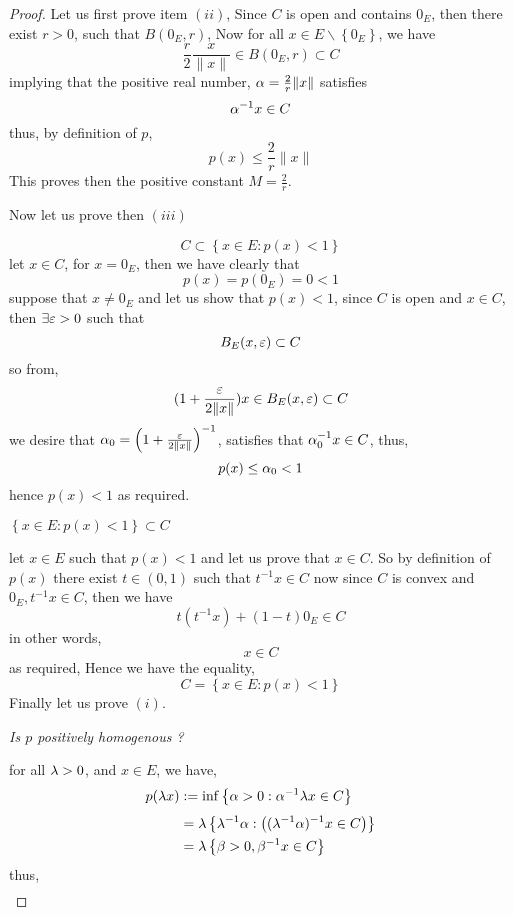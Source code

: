 \begin{proof}
Let us first prove item $(ii)$, Since $C $ is open 
and contains $0_{E}$, then there exist 
$r > 0 $, such that $B(0_{E},r)$, Now for all 
$x \in  E \backslash \left\{ 0_{E} \right\} $, we
have
\[
\frac{r}{2} \frac{x}{\| x \| } \in  B(0_{E},r) 
\subset C
\]
implying that the positive real number, 
$\alpha = \frac{2}{r}\| x \|  $  satisfies 
\[
\alpha^{-1}x \in  C
\] 
thus, by definition of $p $, 
\[
p(x) \leq \frac{2}{r} \| x \| 
\]
This proves then the positive constant $M = \frac{2}{r}$.
\\
\begin{center}
Now let us prove then $(iii)$
\end{center}
\[
C \subset \left\{  x \in  E: p(x) < 1\right\} 
\] 
let $x \in  C $, for $x = 0_{E} $, then we have clearly
that 
\[
p(x) =  p(0_{E})  = 0 <  1
\]
suppose that $x \neq 0_{E} $  and let us show
that $p(x) < 1$, since $C $ is open and $x \in  C $,
then $\exists  \varepsilon > 0 $  such that 
\[
	B_{E}(x, \varepsilon )  \subset C
\]
so from, 
\[
	(1 + \frac{\varepsilon }{2 \| x \| })
	x \in    
	B_{E}(x, \varepsilon )  \subset  C
\]
we desire that 
$\alpha_0 = \left( 1 + \frac{\varepsilon }{2 \| x \| } \right)^{-1}$, satisfies
that $\alpha_0^{-1} x \in  C $, thus, 
\[
p(x) \leq \alpha_0 < 1
\]
hence $p(x)<1$ as required.
\begin{center}
	$\left\{ x \in  E: p(x) < 1 \right\} \subset C$ 
\end{center}
let $x \in  E $ such that $p(x) <  1$ and let us prove that 
$x \in C$. So by definition of $p(x)$ there exist 
$t \in (0,1)$ such that $t^{-1} x \in C $ now since 
$C $ is convex and $0_{E}, t^{-1} x \in  C $, then we have 
\[
t \left( t^{-1} x \right) + 
\left( 1-t \right) 0_{E} \in  C
\]
in other words, 
\[
x \in  C
\]
as required, Hence we have the equality, 
\[
C = 
\left\{ x \in  E : p(x) <  1\right\}
\]
Finally let us prove $(i)$. 
\begin{center}
	\it Is $p $ positively homogenous ? \normalfont
\end{center}
for all $\lambda > 0 $, and $x \in  E $, we have, 
\begin{align*}
p(\lambda x) &:= 
\inf_{} \left\{ 
\alpha > 0: \alpha^{-1} \lambda x \in C\right\} \\
	 &= \lambda \left\{ 
		 \lambda^{-1}\alpha : 
		 \left( 
			 (\lambda^{-1} \alpha)^{-1}x \in  C
		 \right)
	 \right\}
	\\
	 &= 
	 \lambda \left\{ 
		 \beta > 0, \beta^{-1} x \in  C
	 \right\}
\end{align*}
thus, 
\begin{align*}

\end{align*}
\end{proof}
